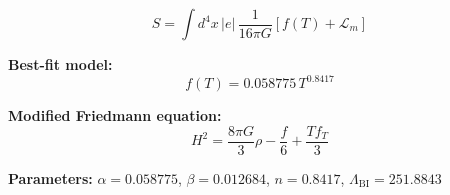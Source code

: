 
\begin{equation}
  S = \int d^4x \, |e| \, \frac{1}{16\pi G} \left[ f(T) + \mathcal{L}_m \right]
\end{equation}

\textbf{Best-fit model:}
\begin{equation}
  f(T) = 0.058775 \, T^{0.8417}
\end{equation}

\textbf{Modified Friedmann equation:}
\begin{equation}
  H^2 = \frac{8\pi G}{3} \rho - \frac{f}{6} + \frac{T f_T}{3}
\end{equation}

\textbf{Parameters:}
$\alpha = 0.058775$, \quad
$\beta = 0.012684$, \quad
$n = 0.8417$, \quad
$\Lambda_{\text{BI}} = 251.8843$